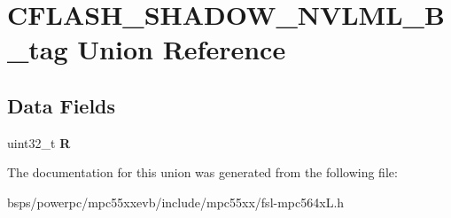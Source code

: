 \hypertarget{unionCFLASH__SHADOW__NVLML__32B__tag}{}\section{C\+F\+L\+A\+S\+H\+\_\+\+S\+H\+A\+D\+O\+W\+\_\+\+N\+V\+L\+M\+L\+\_\+B\+\_\+tag Union Reference}
\label{unionCFLASH__SHADOW__NVLML__32B__tag}
\subsection*{Data Fields}
\begin{DoxyCompactItemize}
\item 
\mbox{\label{unionCFLASH__SHADOW__NVLML__32B__tag_a8870f5cabc2d4ae493347c9565cfb8aa}} 
uint32\+\_\+t {\bfseries R}
\end{DoxyCompactItemize}


The documentation for this union was generated from the following file\+:\begin{DoxyCompactItemize}
\item 
bsps/powerpc/mpc55xxevb/include/mpc55xx/fsl-\/mpc564x\+L.\+h\end{DoxyCompactItemize}
